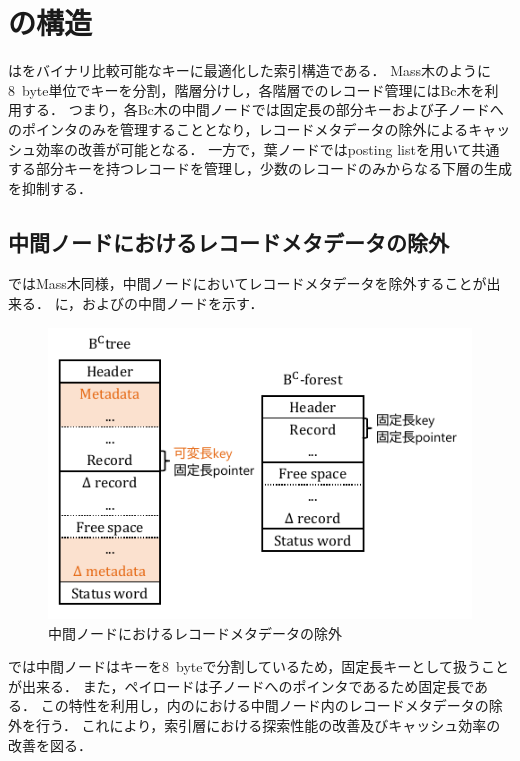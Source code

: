 \section{\Bcforest{}の構造}
\label{sec:bc_forest_structure}

\Bcforest{}は\Bctree{}をバイナリ比較可能なキーに最適化した索引構造である．
Mass木のように8~byte単位でキーを分割，階層分けし，各階層でのレコード管理にはBc木を利用する．
つまり，各Bc木の中間ノードでは固定長の部分キーおよび子ノードへのポインタのみを管理することとなり，レコードメタデータの除外によるキャッシュ効率の改善が可能となる．
一方で，葉ノードではposting listを用いて共通する部分キーを持つレコードを管理し，少数のレコードのみからなる下層の生成を抑制する．

\subsection{中間ノードにおけるレコードメタデータの除外}
\Bcforest{}ではMass木同様，中間ノードにおいてレコードメタデータを除外することが出来る．
\Fig{\ref{fig:inner}}に，\Bctree{}および\Bcforest{}の中間ノードを示す．

\begin{figure}[t]
    \centering
    \includegraphics{./figures/inner_node.pdf}
    \caption{\Bcforest{}中間ノードにおけるレコードメタデータの除外}
    \label{fig:inner}
\end{figure}

\Bcforest{}では中間ノードはキーを8~byteで分割しているため，固定長キーとして扱うことが出来る．
また，ペイロードは子ノードへのポインタであるため固定長である．
この特性を利用し，\Bcforest{}内の\Bctree{}における中間ノード内のレコードメタデータの除外を行う．
これにより，索引層における探索性能の改善及びキャッシュ効率の改善を図る．

